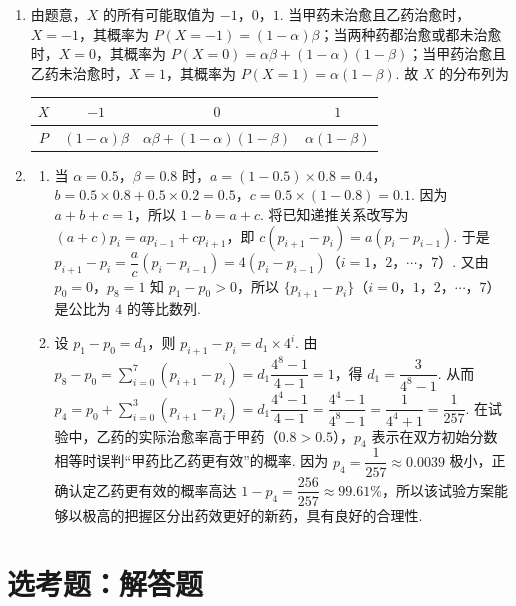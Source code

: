 \begin{solution}
\begin{enumerate}
\item 由题意，\(X\) 的所有可能取值为 \(-1\)，\(0\)，\(1\). 当甲药未治愈且乙药治愈时，\(X=-1\)，其概率为 \(P(X=-1)=(1-\alpha)\beta\)；当两种药都治愈或都未治愈时，\(X=0\)，其概率为 \(P(X=0)=\alpha\beta+(1-\alpha)(1-\beta)\)；当甲药治愈且乙药未治愈时，\(X=1\)，其概率为 \(P(X=1)=\alpha(1-\beta)\). 故 \(X\) 的分布列为

\begin{center}
\begin{tabular}{c|ccc}
\(X\) & \(-1\) & \(0\) & \(1\) \\ \hline
\(P\) & \((1-\alpha)\beta\) & \(\alpha\beta+(1-\alpha)(1-\beta)\) & \(\alpha(1-\beta)\)
\end{tabular}
\end{center}

\item
\begin{enumerate}
\item 当 \(\alpha=0.5\)，\(\beta=0.8\) 时，\(a=(1-0.5)\times0.8=0.4\)，\(b=0.5\times0.8+0.5\times0.2=0.5\)，\(c=0.5\times(1-0.8)=0.1\). 因为 \(a+b+c=1\)，所以 \(1-b=a+c\). 将已知递推关系改写为 \((a+c)p_i=ap_{i-1}+cp_{i+1}\)，即 \(c(p_{i+1}-p_i)=a(p_i-p_{i-1})\). 于是 \(p_{i+1}-p_i=\dfrac ac(p_i-p_{i-1})=4(p_i-p_{i-1})\)（\(i=1\)，\(2\)，\(\cdots\)，\(7\)）. 又由 \(p_0=0\)，\(p_8=1\) 知 \(p_1-p_0>0\)，所以 \(\{p_{i+1}-p_i\}\)（\(i=0\)，\(1\)，\(2\)，\(\cdots\)，\(7\)）是公比为 \(4\) 的等比数列.
\item 设 \(p_1-p_0=d_1\)，则 \(p_{i+1}-p_i=d_1\times4^i\). 由 \(p_8-p_0=\displaystyle\sum_{i=0}^7(p_{i+1}-p_i)=d_1\dfrac{4^8-1}{4-1}=1\)，得 \(d_1=\dfrac{3}{4^8-1}\). 从而 \(p_4=p_0+\displaystyle\sum_{i=0}^3(p_{i+1}-p_i)=d_1\dfrac{4^4-1}{4-1}=\dfrac{4^4-1}{4^8-1}=\dfrac{1}{4^4+1}=\dfrac{1}{257}\). 在试验中，乙药的实际治愈率高于甲药（\(0.8>0.5\)），\(p_4\) 表示在双方初始分数相等时误判“甲药比乙药更有效”的概率. 因为 \(p_4=\dfrac{1}{257}\approx0.0039\) 极小，正确认定乙药更有效的概率高达 \(1-p_4=\dfrac{256}{257}\approx99.61\%\)，所以该试验方案能够以极高的把握区分出药效更好的新药，具有良好的合理性.
\end{enumerate}
\end{enumerate}
\end{solution}

\section{选考题：解答题}

